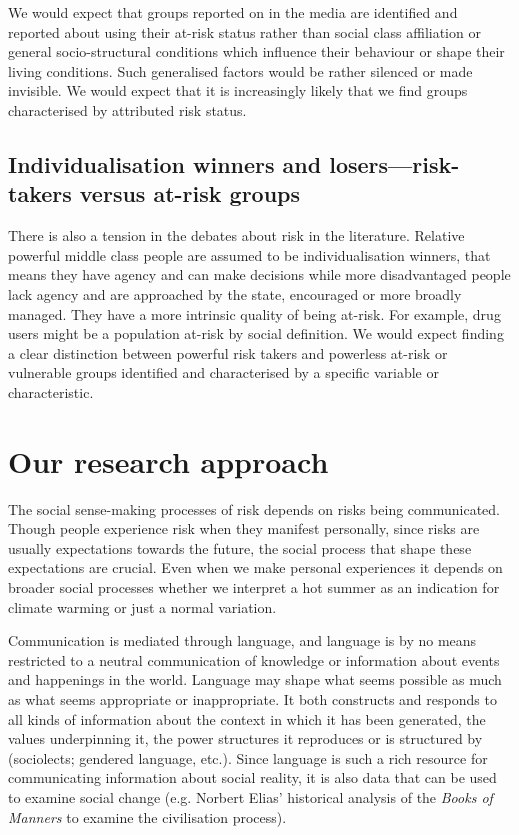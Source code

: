 We would expect that groups reported on in the media are identified and reported about using their at-risk status rather than social class affiliation or general socio-structural conditions which influence their behaviour or shape their living conditions. Such generalised factors would be rather silenced or made invisible. We would expect that it is increasingly likely that we find groups characterised by attributed risk status.

\subsection*{Individualisation winners and losers---risk-takers versus at-risk groups}

There is also a tension in the debates about risk in the literature. Relative powerful middle class people are assumed to be individualisation winners, that means they have agency and can make decisions while more disadvantaged people lack agency and are approached by the state, encouraged or more broadly managed. They have a more intrinsic quality of being at-risk. For example, drug users might be a population at-risk by social definition. We would expect finding a clear distinction between powerful risk takers and powerless at-risk or vulnerable groups identified and characterised by a specific variable or characteristic.


\section{Our research approach}

The social sense-making processes of risk depends on risks being communicated. Though people experience risk when they manifest personally, since risks are usually expectations towards the future, the social process that shape these expectations are crucial. Even when we make personal experiences it depends on broader social processes whether we interpret a hot summer as an indication for climate warming or just a normal variation.

Communication is mediated through language, and language is by no means restricted to a neutral communication of knowledge or information about events and happenings in the world. Language may shape what seems possible as much as what seems appropriate or inappropriate. It both constructs and responds to all kinds of information about the context in which it has been generated, the values underpinning it, the power structures it reproduces or is structured by (sociolects; gendered language, etc.). Since language is such a rich resource for communicating information about social reality, it is also data that can be used to examine social change (e.g. Norbert Elias' historical analysis of the \emph{Books of Manners} to examine the civilisation process). 

